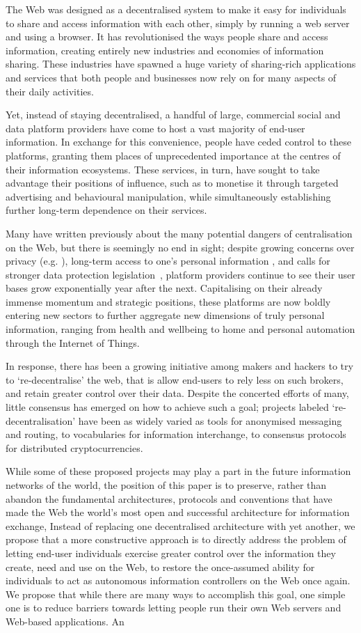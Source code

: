 \documentclass{amsart}
\begin{document}
The Web was designed as a decentralised system to make it easy for individuals to share and access information with each other, simply by running a web server and using a browser.  It has revolutionised the ways people share and access information, creating entirely new industries and economies of information sharing.  These industries have spawned a huge variety of sharing-rich applications and services that both people and businesses now rely on for many aspects of their daily activities.  

Yet, instead of staying decentralised, a handful of large, commercial social and data platform providers have come to host a vast majority of end-user information.  In exchange for this convenience, people have ceded control to these platforms, granting them places of unprecedented importance at the centres of their information ecosystems. These services, in turn, have sought to take advantage their positions of influence, such as to monetise it through targeted advertising and behavioural manipulation, while simultaneously establishing further long-term dependence on their services.

Many have written previously about the many potential dangers of centralisation on the Web, but there is seemingly no end in sight; despite growing concerns over privacy (e.g. \cite{}), long-term access to one's personal information \cite{}, and calls for stronger data protection legislation~\cite{}, platform providers continue to see their user bases grow exponentially year after the next.  Capitalising on their already immense momentum and strategic positions, these platforms are now boldly entering new sectors to further aggregate new dimensions of truly personal information, ranging from health and wellbeing to home and personal automation through the Internet of Things.  

In response, there has been a growing initiative among makers and hackers to try to `re-decentralise' the web, that is allow end-users to rely less on such brokers, and retain greater control over their data.  Despite the concerted efforts of many, little consensus has emerged on how to achieve such a goal; projects labeled `re-decentralisation' have been as widely varied as tools for anonymised messaging and routing, to vocabularies for information interchange, to consensus protocols for distributed cryptocurrencies.

While some of these proposed projects may play a part in the future information networks of the world, the position of this paper is to preserve, rather than abandon the fundamental architectures, protocols and conventions that have made the Web the world's most open and successful architecture for information exchange,   Instead of replacing one decentralised architecture with yet another, we propose that a more constructive approach is to directly address the problem of letting end-user individuals exercise greater control over the information they create, need and use on the Web, to restore the once-assumed ability for individuals to act as autonomous information controllers on the Web once again.  We propose that while there are many ways to accomplish this goal, one simple one is to reduce barriers towards letting people run their own Web servers and Web-based applications. An
\end{document}
